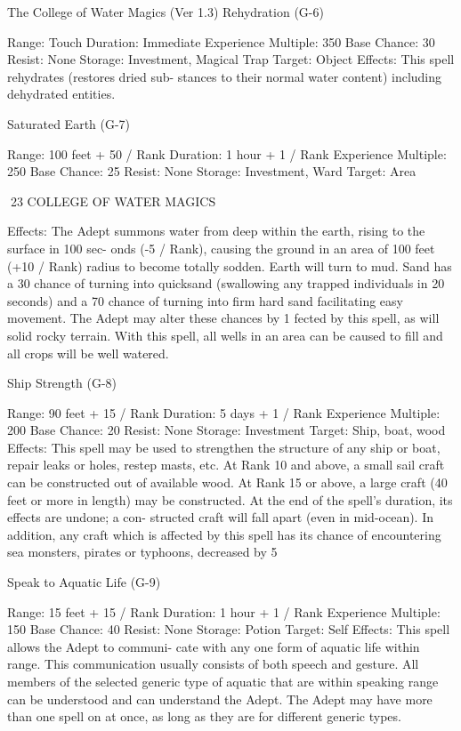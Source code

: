 \begin{Chapter}{The College of Water Magics (Ver 1.3)}
Rehydration (G-6) 

Range: Touch 
Duration: Immediate 
Experience Multiple: 350 
Base Chance: 30%
Resist: None 
Storage: Investment, Magical Trap 
Target: Object 
Effects:  This  spell  rehydrates  (restores  dried  sub-
stances  to  their  normal  water  content)  including 
dehydrated entities. 

Saturated Earth (G-7) 

Range: 100 feet + 50 / Rank 
Duration: 1 hour + 1 / Rank 
Experience Multiple: 250 
Base Chance: 25%
Resist: None 
Storage: Investment, Ward 
Target: Area 

23 COLLEGE OF WATER MAGICS 

Effects:  The  Adept  summons  water  from  deep 
within  the  earth,  rising  to  the  surface  in  100  sec-
onds (-5 / Rank), causing the ground in an area of 
100  feet  (+10  /  Rank)  radius  to  become  totally 
sodden.  Earth  will  turn  to  mud.  Sand  has  a  30%
chance  of  turning  into  quicksand  (swallowing  any 
trapped  individuals  in  20  seconds)  and  a  70%
chance  of  turning  into  firm  hard  sand  facilitating 
easy  movement.  The  Adept  may  alter  these 
chances  by  1%
fected  by  this  spell,  as  will  solid  rocky  terrain. 
With this spell, all wells in an area can be caused to 
fill and all crops will be well watered. 

Ship Strength (G-8) 

Range: 90 feet + 15 / Rank 
Duration: 5 days + 1 / Rank 
Experience Multiple: 200 
Base Chance: 20%
Resist: None 
Storage: Investment 
Target: Ship, boat, wood 
Effects:  This  spell  may  be  used  to  strengthen  the 
structure of any ship or boat, repair leaks or holes, 
restep  masts,  etc.  At  Rank  10  and  above,  a  small 
sail craft can be constructed out of available wood. 
At Rank 15 or above, a large craft (40 feet or more 
in  length)  may  be  constructed.  At  the  end  of  the 
spell’s  duration,  its  effects  are  undone;  a  con-
structed craft will fall apart (even in mid-ocean). In 
addition,  any  craft  which  is  affected  by  this  spell 
has its chance of encountering sea monsters, pirates 
or typhoons, decreased by 5%

Speak to Aquatic Life (G-9) 

Range: 15 feet + 15 / Rank 
Duration: 1 hour + 1 / Rank 
Experience Multiple: 150 
Base Chance: 40%
Resist: None 
Storage: Potion 
Target: Self 
Effects:  This  spell  allows  the  Adept  to  communi-
cate with any one form of aquatic life within range. 
This  communication  usually  consists  of  both 
speech  and  gesture.  All  members  of  the  selected 
generic  type  of  aquatic  that  are  within  speaking 
range  can  be  understood  and  can  understand  the 
Adept. The Adept may have more than one spell on 
at  once,  as  long  as  they  are  for  different  generic 
types. 


\end{Chapter}
